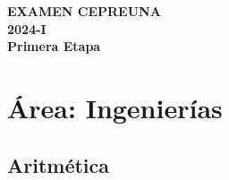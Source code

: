 \thispagestyle{empty}


\newpage
\mbox{}               %
\newpage



\vspace*{\fill}
\begin{center}
	{\Huge\bfseries EXAMEN CEPREUNA }\\[10pt]
	
	{\Huge\bfseries 2024-I}\\[10pt]
	{\Large\bfseries Primera Etapa}
\end{center}
\vspace*{\fill}

\clearpage






\section*{Área: Ingenierías}





\subsection*{Aritmética}

